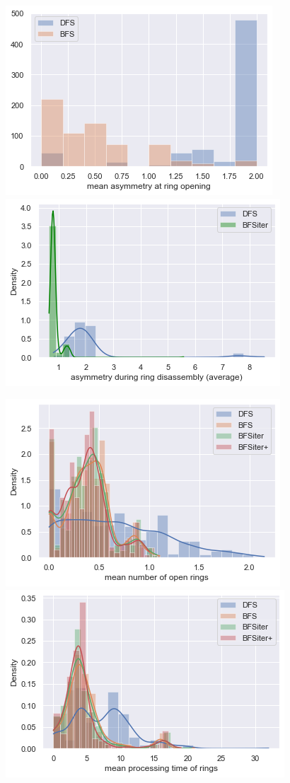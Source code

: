 \begin{figure}
	
	\includegraphics[scale=0.8]{mean_ass_beginn_bfs}\includegraphics[scale=0.8]{mean_ass_total_onlyiter}
	
	\includegraphics[scale=0.8]{mean_open_rings_all}\includegraphics[scale=0.8]{mean_processing_all}
	

\end{figure}
